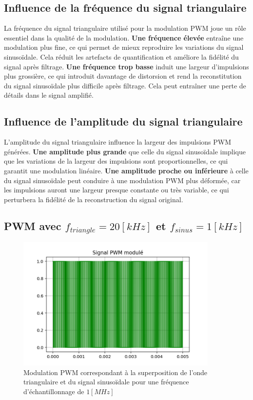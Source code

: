 \documentclass[a4paper,12pt,oneside]{report}	%
\begin{document}
        \subsection{Influence de la fréquence du signal triangulaire}
            La fréquence du signal triangulaire utilisé pour la modulation PWM joue un rôle essentiel dans la qualité de la modulation. \textbf{Une fréquence élevée} entraîne une modulation plus fine, ce qui permet de mieux reproduire les variations du signal sinusoïdale. Cela réduit les artefacts de quantification et améliore la fidélité du signal après filtrage. \textbf{Une fréquence trop basse} induit une largeur d'impulsions plus grossière, ce qui introduit davantage de distorsion et rend la reconstitution du signal sinusoïdale plus difficile après filtrage. Cela peut entraîner une perte de détails dans le signal amplifié.
        \subsection{Influence de l'amplitude du signal triangulaire}
            L'amplitude du signal triangulaire influence la largeur des impulsions PWM générées. \textbf{Une amplitude plus grande} que celle du signal sinusoïdale implique que les variations de la largeur des impulsions sont proportionnelles, ce qui garantit une modulation linéaire. \textbf{Une amplitude proche ou inférieure} à celle du signal sinusoïdale peut conduire à une modulation PWM plus déformée, car les impulsions auront une largeur presque constante ou très variable, ce qui perturbera la fidélité de la reconstruction du signal original.
        \subsection{PWM avec $f_{triangle}=20 [kHz]$ et $f_{sinus}=1 [kHz]$}
        \begin{figure}[h!]
                \centering
                \includegraphics[width=10cm]{code-projet-python/1.1.4 - PWM btw sin and tri.png}
                \caption{Modulation PWM correspondant à la superposition de l'onde triangulaire et du signal sinusoïdale pour une fréquence d’échantillonnage de $1 [MHz]$}
                \label{fig:echantillon_1MHz}
            \end{figure}
\newpage
\end{document}
